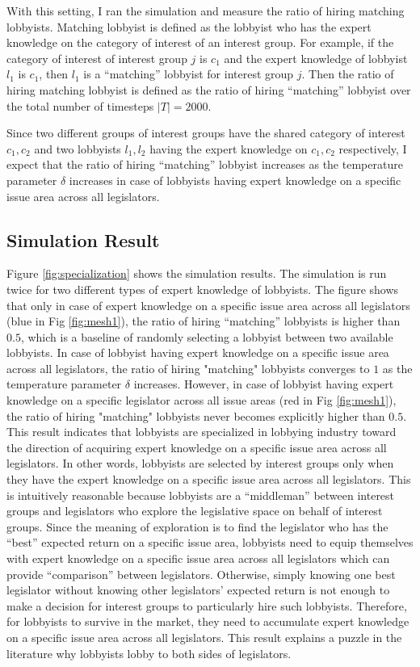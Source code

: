 \documentclass{article}
\begin{document}
With this setting, I ran the simulation and measure 
the ratio of hiring matching lobbyists. 
Matching lobbyist is defined as the lobbyist who has the expert knowledge on the category of interest of an interest group.
For example, if the category of interest of interest group $j$ is $c_1$
and the expert knowledge of lobbyist $l_1$ is $c_1$, 
then $l_1$ is a ``matching'' lobbyist for interest group $j$.
Then the ratio of hiring matching lobbyist is defined as 
the ratio of hiring ``matching'' lobbyist over the total number of timesteps $|T|=2000$.

Since two different groups of interest groups have the shared category of interest $c_1, c_2$
and two lobbyists $l_1, l_2$ having the expert knowledge on $c_1, c_2$ respectively, 
I expect that the ratio of hiring ``matching'' lobbyist increases 
as the temperature parameter $\delta$ increases in case of lobbyists having expert knowledge on a specific issue area across all legislators.

\subsection{\large{Simulation Result}}

Figure \ref{fig:specialization} shows the simulation results.
The simulation is run twice for two different types of expert knowledge of lobbyists.
The figure shows that only in case of expert knowledge on a specific issue area across all legislators (blue in Fig \ref{fig:mesh1}),
the ratio of hiring ``matching'' lobbyists is higher than $0.5$, which is a baseline of randomly selecting a lobbyist between two available lobbyists.
In case of lobbyist having expert knowledge on a specific issue area across all legislators,
the ratio of hiring "matching" lobbyists converges to $1$ as the temperature parameter $\delta$ increases. 
However, in case of lobbyist having expert knowledge on a specific legislator across all issue areas (red in Fig \ref{fig:mesh1}),
the ratio of hiring "matching" lobbyists never becomes explicitly higher than $0.5$.
This result indicates that lobbyists are specialized in lobbying industry
toward the direction of acquiring expert knowledge on a specific issue area across all legislators.
In other words, lobbyists are selected by 
interest groups only when they have the expert knowledge on a specific issue area across all legislators.
This is intuitively reasonable because lobbyists are 
a ``middleman'' between interest groups and legislators
who explore the legislative space on behalf of interest groups.
Since the meaning of exploration is to find the legislator 
who has the ``best'' expected return on a specific issue area,
lobbyists need to equip themselves with expert knowledge on a specific issue area across all legislators
which can provide ``comparison'' between legislators.
Otherwise, simply knowing one best legislator without knowing other legislators' expected return
is not enough to make a decision for interest groups to particularly hire such lobbyists.
Therefore, for lobbyists to survive in the market,
they need to accumulate expert knowledge on a specific issue area across all legislators.
This result explains a puzzle in the literature why lobbyists lobby to both sides of legislators.
\end{document}
